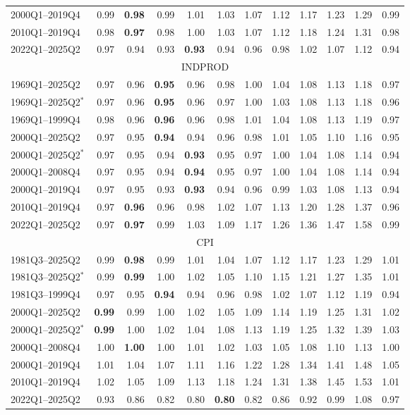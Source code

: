 \begin{tabular}{lrrrrrrrrrrr}
2000Q1--2019Q4 & 0.99 & \textbf{0.98} & 0.99 & 1.01 & 1.03 & 1.07 & 1.12 & 1.17 & 1.23 & 1.29 & 0.99 \\
2010Q1--2019Q4 & 0.98 & \textbf{0.97} & 0.98 & 1.00 & 1.03 & 1.07 & 1.12 & 1.18 & 1.24 & 1.31 & 0.98 \\
2022Q1--2025Q2 & 0.97 & 0.94 & 0.93 & \textbf{0.93} & 0.94 & 0.96 & 0.98 & 1.02 & 1.07 & 1.12 & 0.94 \\
\hline
\multicolumn{12}{c}{INDPROD} \\
1969Q1--2025Q2 & 0.97 & 0.96 & \textbf{0.95} & 0.96 & 0.98 & 1.00 & 1.04 & 1.08 & 1.13 & 1.18 & 0.97 \\
1969Q1--2025Q2$^*$ & 0.97 & 0.96 & \textbf{0.95} & 0.96 & 0.97 & 1.00 & 1.03 & 1.08 & 1.13 & 1.18 & 0.96 \\
1969Q1--1999Q4 & 0.98 & 0.96 & \textbf{0.96} & 0.96 & 0.98 & 1.01 & 1.04 & 1.08 & 1.13 & 1.19 & 0.97 \\
2000Q1--2025Q2 & 0.97 & 0.95 & \textbf{0.94} & 0.94 & 0.96 & 0.98 & 1.01 & 1.05 & 1.10 & 1.16 & 0.95 \\
2000Q1--2025Q2$^*$ & 0.97 & 0.95 & 0.94 & \textbf{0.93} & 0.95 & 0.97 & 1.00 & 1.04 & 1.08 & 1.14 & 0.94 \\
2000Q1--2008Q4 & 0.97 & 0.95 & 0.94 & \textbf{0.94} & 0.95 & 0.97 & 1.00 & 1.04 & 1.08 & 1.14 & 0.94 \\
2000Q1--2019Q4 & 0.97 & 0.95 & 0.93 & \textbf{0.93} & 0.94 & 0.96 & 0.99 & 1.03 & 1.08 & 1.13 & 0.94 \\
2010Q1--2019Q4 & 0.97 & \textbf{0.96} & 0.96 & 0.98 & 1.02 & 1.07 & 1.13 & 1.20 & 1.28 & 1.37 & 0.96 \\
2022Q1--2025Q2 & 0.97 & \textbf{0.97} & 0.99 & 1.03 & 1.09 & 1.17 & 1.26 & 1.36 & 1.47 & 1.58 & 0.99 \\
\hline
\multicolumn{12}{c}{CPI} \\
1981Q3--2025Q2 & 0.99 & \textbf{0.98} & 0.99 & 1.01 & 1.04 & 1.07 & 1.12 & 1.17 & 1.23 & 1.29 & 1.01 \\
1981Q3--2025Q2$^*$ & 0.99 & \textbf{0.99} & 1.00 & 1.02 & 1.05 & 1.10 & 1.15 & 1.21 & 1.27 & 1.35 & 1.01 \\
1981Q3--1999Q4 & 0.97 & 0.95 & \textbf{0.94} & 0.94 & 0.96 & 0.98 & 1.02 & 1.07 & 1.12 & 1.19 & 0.94 \\
2000Q1--2025Q2 & \textbf{0.99} & 0.99 & 1.00 & 1.02 & 1.05 & 1.09 & 1.14 & 1.19 & 1.25 & 1.31 & 1.02 \\
2000Q1--2025Q2$^*$ & \textbf{0.99} & 1.00 & 1.02 & 1.04 & 1.08 & 1.13 & 1.19 & 1.25 & 1.32 & 1.39 & 1.03 \\
2000Q1--2008Q4 & 1.00 & \textbf{1.00} & 1.00 & 1.01 & 1.02 & 1.03 & 1.05 & 1.08 & 1.10 & 1.13 & 1.00 \\
2000Q1--2019Q4 & 1.01 & 1.04 & 1.07 & 1.11 & 1.16 & 1.22 & 1.28 & 1.34 & 1.41 & 1.48 & 1.05 \\
2010Q1--2019Q4 & 1.02 & 1.05 & 1.09 & 1.13 & 1.18 & 1.24 & 1.31 & 1.38 & 1.45 & 1.53 & 1.01 \\
2022Q1--2025Q2 & 0.93 & 0.86 & 0.82 & 0.80 & \textbf{0.80} & 0.82 & 0.86 & 0.92 & 0.99 & 1.08 & 0.97 \\
\hline
\end{tabular}
